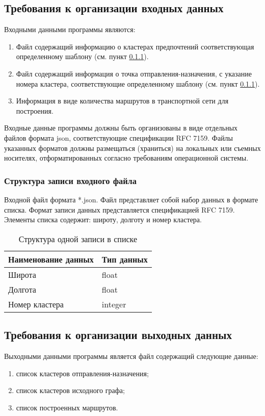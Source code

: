 \subsection{Требования к организации входных данных}\label{input-files}
Входными данными программы являются:
\begin{enumerate}
    \item Файл содержащий информацию о кластерах предпочтений соответствующая определенному шаблону (см. пункт 
        \ref{file-format}).
    \item Файл содержащий информация о точка отправления-назначения, с указание номера кластера, соответствующие 
        определенному шаблону (см. пункт \ref{file-format}). 
    \item Информация в виде количества маршрутов в транспортной сети для построения.
\end{enumerate}

Входные данные программы должны быть организованы в виде отдельных файлов формата json, соответствующие спецификации 
RFC 7159. Файлы указанных форматов должны размещаться (храниться) на локальных или съемных носителях, отформатированных 
согласно требованиям операционной системы.

\subsubsection{Структура записи входного файла}\label{file-format}
Входной файл формата *.json. Файл представляет собой набор данных в формате списка. Формат записи данных представляется 
спецификацией RFC 7159. Элементы списка содержит: широту, долготу и номер кластера.

\begin{table}[ht!]
    \centering
    \caption{Структура одной записи в списке}
    \label{table:clusters}
    \begin{tabular}{|l|l|}
        \hline
        Наименование данных & Тип данных \\ \hline
        Широта              & float      \\ \hline
        Долгота             & float      \\ \hline
        Номер кластера      & integer    \\ \hline
    \end{tabular}
\end{table}

\subsection{Требования к организации выходных данных}\label{output-files}
Выходными данными программы является файл содержащий следующие данные:
\begin{enumerate}
    \item список кластеров отправления-назначения;
    \item список кластеров исходного графа;
    \item список построенных маршрутов.
\end{enumerate}

